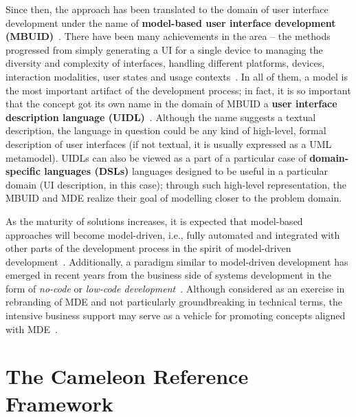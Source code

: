 Since then, the approach has been translated to the domain of user interface development under the name of \textbf{model-based user interface development (MBUID)}~\cite{Puerta1994}.
There have been many achievements in the area – the methods progressed from simply generating a UI for a single device to managing the diversity and complexity of interfaces, handling different platforms, devices, interaction modalities, user states and usage contexts~\cite{Meixner2011}.
In all of them, a model is the most important artifact of the development process;
in fact, it is so important that the concept got its own name in the domain of MBUID\,\textendash\,a \textbf{user interface description language (UIDL)}~\cite{guerrero_garcia_theoretical_2009}.
Although the name suggests a textual description, the language in question could be any kind of high-level, formal description of user interfaces (if not textual, it is usually expressed as a UML metamodel).
UIDLs can also be viewed as a part of a particular case of \textbf{domain-specific languages (DSLs)}\,\textendash\,languages designed to be useful in a particular domain (UI description, in this case);
through such high-level representation, the MBUID and MDE realize their goal of modelling closer to the problem domain.

As the maturity of solutions increases, it is expected that model-based approaches will become model-driven, i.e., fully automated and integrated with other parts of the development process in the spirit of model-driven development~\cite{Ruiz2018}.
Additionally, a paradigm similar to model-driven development has emerged in recent years from the business side of systems development in the form of \emph{no-code} or \emph{low-code development}~\cite{Rymer2019}.
Although considered as an exercise in rebranding of MDE and not particularly groundbreaking in technical terms, the intensive business support may serve as a vehicle for promoting concepts aligned with MDE~\cite{Bock2021}.

\section{The Cameleon Reference Framework}\label{sec:the-cameleon-reference-framework}

